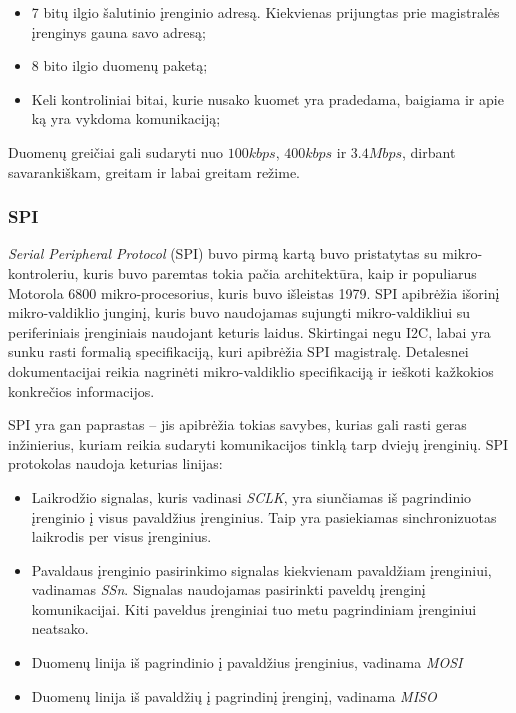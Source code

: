 \begin{itemize}
    \item 7 bitų ilgio šalutinio įrenginio adresą. Kiekvienas prijungtas prie magistralės įrenginys gauna savo adresą;
    \item 8 bito ilgio duomenų paketą;
    \item Keli kontroliniai bitai, kurie nusako kuomet yra pradedama, baigiama ir apie ką yra vykdoma komunikaciją;
\end{itemize}

Duomenų greičiai gali sudaryti nuo $100 kbps$, $400 kbps$ ir $3.4 Mbps$, dirbant savarankiškam, greitam ir labai greitam režime.

\subsubsection{SPI}

\textit{Serial Peripheral Protocol} (SPI) buvo pirmą kartą buvo pristatytas su mikro-kontroleriu, kuris buvo paremtas tokia pačia architektūra, kaip ir populiarus Motorola 6800 mikro-procesorius, kuris buvo išleistas 1979.
SPI apibrėžia išorinį mikro-valdiklio junginį, kuris buvo naudojamas sujungti mikro-valdikliui su periferiniais įrenginiais naudojant keturis laidus. 
Skirtingai negu I2C, labai yra sunku rasti formalią specifikaciją, kuri apibrėžia SPI magistralę.
Detalesnei dokumentacijai reikia nagrinėti mikro-valdiklio specifikaciją ir ieškoti kažkokios konkrečios informacijos.

SPI yra gan paprastas -- jis apibrėžia tokias savybes, kurias gali rasti geras inžinierius, kuriam reikia sudaryti komunikacijos tinklą tarp dviejų įrenginių.
SPI protokolas naudoja keturias linijas:

\begin{itemize}
    \item Laikrodžio signalas, kuris vadinasi \textit{SCLK}, yra siunčiamas iš pagrindinio įrenginio į visus pavaldžius įrenginius. Taip yra pasiekiamas sinchronizuotas laikrodis per visus įrenginius.
    \item Pavaldaus įrenginio pasirinkimo signalas kiekvienam pavaldžiam įrenginiui, vadinamas \textit{SSn}. Signalas naudojamas pasirinkti paveldų įrenginį komunikacijai. Kiti paveldus įrenginiai tuo metu pagrindiniam įrenginiui neatsako.
    \item Duomenų linija iš pagrindinio į pavaldžius įrenginius, vadinama \textit{MOSI}
    \item Duomenų linija iš pavaldžių į pagrindinį įrenginį, vadinama \textit{MISO}
\end{itemize}

